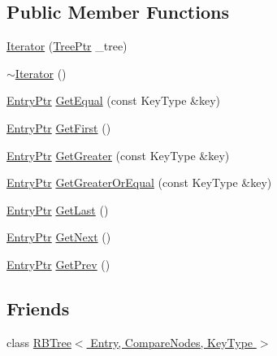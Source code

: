 \subsection*{Public Member Functions}
\begin{DoxyCompactItemize}
\item 
\hyperlink{class_k_k_b_1_1_iterator_a37bd34fa66e93b3614979d822efc9fa7}{Iterator} (\hyperlink{class_k_k_b_1_1_iterator_a18f7c2f566b76a14bb6306a928b7b194}{Tree\+Ptr} \+\_\+tree)
\item 
\hyperlink{class_k_k_b_1_1_iterator_a6f8691fec032408e0cc127fa196dd152}{$\sim$\+Iterator} ()
\item 
\hyperlink{class_k_k_b_1_1_iterator_a5ef3b16d0bdf3de41ca114c2eebd6e1e}{Entry\+Ptr} \hyperlink{class_k_k_b_1_1_iterator_a74be80b6c86749d95dfaf0b30c59673c}{Get\+Equal} (const Key\+Type \&key)
\item 
\hyperlink{class_k_k_b_1_1_iterator_a5ef3b16d0bdf3de41ca114c2eebd6e1e}{Entry\+Ptr} \hyperlink{class_k_k_b_1_1_iterator_a7c546cbf1b724ff715ff947e4ba0fae7}{Get\+First} ()
\item 
\hyperlink{class_k_k_b_1_1_iterator_a5ef3b16d0bdf3de41ca114c2eebd6e1e}{Entry\+Ptr} \hyperlink{class_k_k_b_1_1_iterator_a54e8309c194850b58ed5bbd1ec15f085}{Get\+Greater} (const Key\+Type \&key)
\item 
\hyperlink{class_k_k_b_1_1_iterator_a5ef3b16d0bdf3de41ca114c2eebd6e1e}{Entry\+Ptr} \hyperlink{class_k_k_b_1_1_iterator_a8d4853e9a8cbf9c77e8eaad8cf022967}{Get\+Greater\+Or\+Equal} (const Key\+Type \&key)
\item 
\hyperlink{class_k_k_b_1_1_iterator_a5ef3b16d0bdf3de41ca114c2eebd6e1e}{Entry\+Ptr} \hyperlink{class_k_k_b_1_1_iterator_ab8c611f2a17d109cc896710836aad844}{Get\+Last} ()
\item 
\hyperlink{class_k_k_b_1_1_iterator_a5ef3b16d0bdf3de41ca114c2eebd6e1e}{Entry\+Ptr} \hyperlink{class_k_k_b_1_1_iterator_af78ec93edd4c357c6406effa931eae92}{Get\+Next} ()
\item 
\hyperlink{class_k_k_b_1_1_iterator_a5ef3b16d0bdf3de41ca114c2eebd6e1e}{Entry\+Ptr} \hyperlink{class_k_k_b_1_1_iterator_a5516fa6342e96a6309ad8b55867a4fb4}{Get\+Prev} ()
\end{DoxyCompactItemize}
\subsection*{Friends}
\begin{DoxyCompactItemize}
\item 
class \hyperlink{class_k_k_b_1_1_iterator_aa42becdc72b54f00ba2c0f0e3c2f5717}{R\+B\+Tree$<$ Entry, Compare\+Nodes, Key\+Type $>$}
\end{DoxyCompactItemize}


